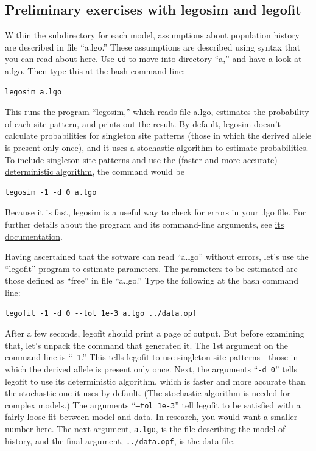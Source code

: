 \documentclass[11pt]{article}
\begin{document}
\subsection{Preliminary exercises with legosim and legofit}
Within the subdirectory for each model, assumptions about population
history are described in file ``a.lgo.''  These assumptions are
described using syntax that you can read about
\href{http://alanrogers.github.io/legofit/html/index.html#lgo}{here}.
Use \texttt{cd} to move into directory ``a,'' and have a look at
\href{https://github.com/alanrogers/agar22/tree/main/legofit/europe/a/a.lgo}{a.lgo}. Then
type this at the bash command line:
\begin{verbatim}
legosim a.lgo
\end{verbatim}
This runs the program ``legosim,'' which reads file
\href{https://github.com/alanrogers/agar22/tree/main/legofit/europe/a/a.lgo}{a.lgo},
estimates the probability of each site pattern, and prints out the
result. By default, legosim doesn't calculate probabilities for
singleton site patterns (those in which the derived allele is present
only once), and it uses a stochastic algorithm to estimate
probabilities. To include singleton site patterns and use the (faster
and more accurate)
\href{https://peercommunityjournal.org/articles/10.24072/pcjournal.132}{deterministic
  algorithm}, the command would be
\begin{verbatim}
legosim -1 -d 0 a.lgo
\end{verbatim}
Because it is fast, legosim is a useful way to check for errors in
your .lgo file. For further details about the program and its
command-line arguments, see
\href{http://alanrogers.github.io/legofit/html/legosim.html}{its
  documentation}.

Having ascertained that the sotware can read ``a.lgo'' without errors,
let's use the ``legofit'' program to estimate parameters. The
parameters to be estimated are those defined as ``free'' in file
``a.lgo.'' Type the following at the bash command line:
\begin{verbatim}
legofit -1 -d 0 --tol 1e-3 a.lgo ../data.opf
\end{verbatim}
After a few seconds, legofit should print a page of output. But before
examining that, let's unpack the command that generated it. The 1st
argument on the command line is ``\texttt{-1}.'' This tells legofit to
use singleton site patterns---those in which the derived allele is
present only once. Next, the arguments ``\texttt{-d 0}'' tells legofit
to use its deterministic algorithm, which is faster and more accurate
than the stochastic one it uses by default. (The stochastic algorithm
is needed for complex models.) The arguments ``\texttt{--tol 1e-3}''
tell legofit to be satisfied with a fairly loose fit between model and
data. In research, you would want a smaller number here. The next
argument, \texttt{a.lgo}, is the file describing the model of history,
and the final argument, \texttt{../data.opf}, is the data file.
\end{document}
